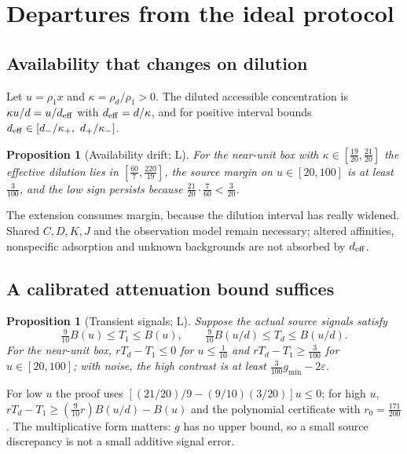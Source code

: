 \documentclass[11pt]{article}
\theoremstyle{plain}
\newtheorem{proposition}[theorem]{Proposition}
\theoremstyle{definition}
\numberwithin{equation}{section}
\newcommand{\eps}{\varepsilon}
\newcommand{\gmin}{g_{\min}}
\newcommand{\Lean}{\textsf{L}}   %
\begin{document}
\section{Departures from the ideal protocol}\label{sec:physical}

\subsection{Availability that changes on dilution}
Let $u=\rho_1x$ and $\kappa=\rho_d/\rho_1>0$. The diluted accessible concentration
is $\kappa u/d=u/d_{\rm eff}$ with $d_{\rm eff}=d/\kappa$, and for positive interval
bounds $d_{\rm eff}\in[d_-/\kappa_+,\ d_+/\kappa_-]$.

\begin{proposition}[Availability drift; \Lean]\label{prop:drift}
For the near-unit box with $\kappa\in[\frac{19}{20},\frac{21}{20}]$ the effective dilution
lies in $[\frac{60}7,\frac{220}{19}]$, the source margin on $u\in[20,100]$ is at least
$\frac3{100}$, and the low sign persists because $\frac{21}{20}\cdot\frac7{60}<\frac3{20}$.
\end{proposition}
The extension consumes margin, because the dilution interval has really widened.
Shared $C,D,K,J$ and the observation model remain necessary; altered affinities,
nonspecific adsorption and unknown backgrounds are not absorbed by $d_{\rm eff}$.

\subsection{A calibrated attenuation bound suffices}
\begin{proposition}[Transient signals; \Lean]\label{prop:transient}
Suppose the actual source signals satisfy
\begin{equation}\label{eq:attenuation}
 \tfrac9{10}B(u)\le T_1\le B(u),\qquad\tfrac9{10}B(u/d)\le T_d\le B(u/d).
\end{equation}
For the near-unit box, $rT_d-T_1\le0$ for $u\le\frac1{10}$ and
$rT_d-T_1\ge\frac3{100}$ for $u\in[20,100]$; with noise, the high contrast is at least
$\frac3{100}\gmin-2\eps$.
\end{proposition}
For low $u$ the proof uses $[(21/20)/9-(9/10)(3/20)]u\le0$; for high $u$,
$rT_d-T_1\ge(\frac9{10}r)B(u/d)-B(u)$ and the polynomial certificate with
$r_0=\frac{171}{200}$. The multiplicative form matters: $g$ has no upper bound, so a
small source discrepancy is not a small additive signal error.
\end{document}
